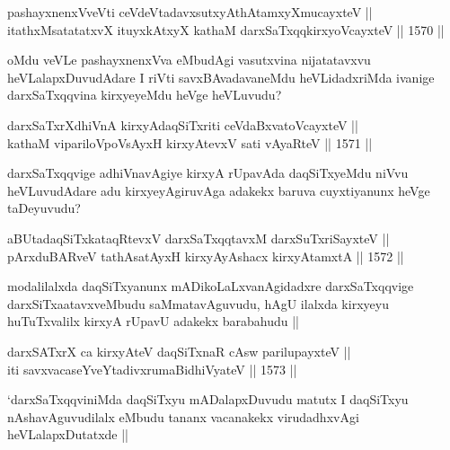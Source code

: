 \begin{shl}
pashayxnenxVveVti ceVdeVtadavxsutxyAthAtamxyXmucayxteV || \\
itathxMsatatatxvX ituyxkAtxyX kathaM darxSaTxqqkirxyoVcayxteV ||  1570 ||  
\end{shl}

\begin{artha}
oMdu veVLe pashayxnenxVva eMbudAgi vasutxvina nijatatavxvu heVLalapxDuvudAdare I riVti savxBAvadavaneMdu heVLidadxriMda ivanige darxSaTxqqvina kirxyeyeMdu heVge heVLuvudu? 
\end{artha}


\begin{shl}
darxSaTxrXdhiVnA kirxyAdaqSiTxriti ceVdaBxvatoVcayxteV ||  \\
kathaM vipariloVpoV\s sAyxH kirxyAtevxV sati vAyaRteV ||  1571 ||  
\end{shl}

\begin{artha}
darxSaTxqqvige adhiVnavAgiye kirxyA rUpavAda daqSiTxyeMdu niVvu heVLuvudAdare adu kirxyeyAgiruvAga adakekx baruva cuyxtiyanunx heVge taDeyuvudu?
\end{artha}

\begin{shl}
aBUtadaqSiTxkataqRtevxV darxSaTxqqtavxM darxSuTxriSayxteV ||  \\
pArxduBARveV tathA\s satAyxH kirxyAyAshacx kirxyAtamxtA ||  1572 ||  
\end{shl}

\begin{artha}
modalilalxda daqSiTxyanunx mADikoLaLxvanAgidadxre darxSaTxqqvige darxSiTxaatavxveMbudu saMmatavAguvudu, hAgU ilalxda kirxyeyu huTuTxvalilx kirxyA rUpavU adakekx barabahudu ||
\end{artha}


\begin{shl}
darxSATxrX ca kirxyAteV daqSiTxnaR cAsw parilupayxteV || \\
iti savxvacaseYveYtadivxrumaBidhiVyateV ||  1573 ||  
\end{shl}

\begin{artha}
`darxSaTxqqviniMda daqSiTxyu mADalapxDuvudu matutx I daqSiTxyu nAshavAguvudilalx eMbudu tananx vacanakekx virudadhxvAgi heVLalapxDutatxde ||
\end{artha}

